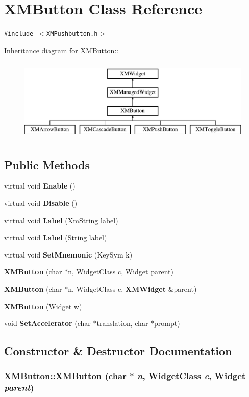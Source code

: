 \section{XMButton  Class Reference}
\label{classXMButton}
{\tt \#include $<$XMPushbutton.h$>$}

Inheritance diagram for XMButton::\begin{figure}[H]
\begin{center}
\leavevmode
\includegraphics[height=4cm]{classXMButton}
\end{center}
\end{figure}
\subsection*{Public Methods}
\begin{CompactItemize}
\item 
virtual void {\bf Enable} ()
\item 
virtual void {\bf Disable} ()
\item 
virtual void {\bf Label} (Xm\-String label)
\item 
virtual void {\bf Label} (String label)
\item 
virtual void {\bf Set\-Mnemonic} (Key\-Sym k)
\item 
{\bf XMButton} (char $\ast$n, Widget\-Class c, Widget parent)
\item 
{\bf XMButton} (char $\ast$n, Widget\-Class c, {\bf XMWidget} \&parent)
\item 
{\bf XMButton} (Widget w)
\item 
void {\bf Set\-Accelerator} (char $\ast$translation, char $\ast$prompt)
\end{CompactItemize}


\subsection{Constructor \& Destructor Documentation}
\subsubsection{\setlength{\rightskip}{0pt plus 5cm}XMButton::XMButton (char $\ast$ {\em n}, Widget\-Class {\em c}, Widget {\em parent})\hspace{0.3cm}{\tt  [inline]}}\label{classXMButton_a5}




